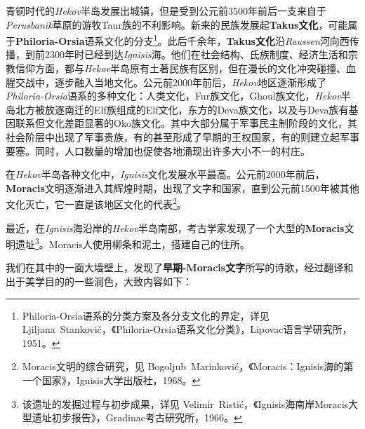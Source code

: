 青铜时代的\textit{Hekov}半岛发展出城镇，但是受到公元前3500年前后一支来自于\textit{Perusbanik}草原的游牧Taur族的不利影响。新来的民族发展起\textbf{Takus文化}，可能属于\textbf{Philoria-Orsia}语系文化的分支\footnote{Philoria-Orsia语系的分类方案及各分支文化的界定，详见 Ljiljana~Stanković，《Philoria-Orsia语系文化分类》，Lipovac语言学研究所，1951。}。此后千余年，\textbf{Takus文化}沿\textit{Raussen}河向西传播，到前2300年时已经到达\textit{Ignisis}海。他们在社会结构、氏族制度、经济生活和宗教信仰方面，都与\textit{Hekov}半岛原有土著民族有区别，但在漫长的文化冲突碰撞、血腥交战中，逐步融入当地文化。公元前2000年前后，\textit{Hekov}地区逐渐形成了\textit{Philoria-Orsia}语系的多种文化：人类文化，Fur族文化，Ghoul族文化，\textit{Hekov}半岛北方被放逐南迁的Elf族组成的Elf文化，东方的Deva族文化，以及与Deva族有基因联系但文化差距显著的Oko族文化。其中大部分属于军事民主制阶段的文化，其社会阶层中出现了军事贵族，有的甚至形成了早期的王权国家，有的则建立起军事要塞。同时，人口数量的增加也促使各地涌现出许多大小不一的村庄。

在\textit{Hekov}半岛各种文化中，\textit{Ignisis}文化发展水平最高。公元前2000年前后，\textbf{Moracis}文明逐渐进入其辉煌时期，出现了文字和国家，直到公元前1500年被其他文化灭亡，它一直是该地区文化的代表\footnote{Moracis文明的综合研究，见 Bogoljub~Marinković，《Moracis：Ignisis海的第一个国家》，Ignisis大学出版社，1968。}。

最近，在\textit{Ignisis}海沿岸的\textit{Hekov}半岛南部，考古学家发现了一个大型的\textbf{Moracis}文明遗址\footnote{该遗址的发掘过程与初步成果，详见 Velimir~Ristić，《Ignisis海南岸Moracis大型遗址初步报告》，Gradinac考古研究所，1966。}。Moracis人使用柳条和泥土，搭建自己的住所。

我们在其中的一面大墙壁上，发现了\textbf{早期-Moracis文字}所写的诗歌，经过翻译和出于美学目的的一些润色，大致内容如下：

